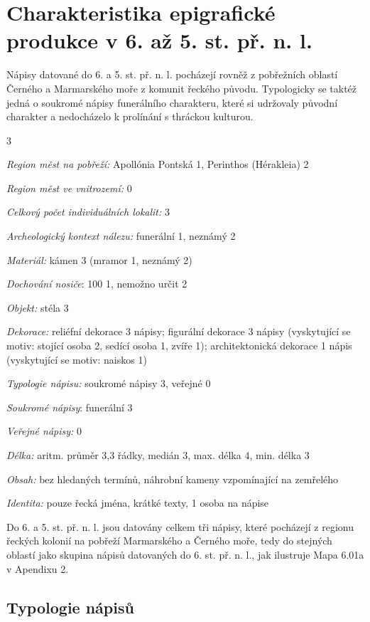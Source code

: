 \section[charakteristika-epigrafické-produkce-v-6.-až-5.-st.-př.-n.-l.]{Charakteristika epigrafické produkce v 6. až 5. st. př. n. l.}

Nápisy datované do 6. a 5. st. př. n. l. pocházejí rovněž z pobřežních oblastí Černého a Marmarského moře z komunit řeckého původu. Typologicky se taktéž jedná o soukromé nápisy funerálního charakteru, které si udržovaly původní charakter a nedocházelo k prolínání s thráckou kulturou.

\placetable[none]{}
\starttable[|l|]
\HL
{} 3

{\em Region měst na pobřeží:} Apollónia Pontská 1, Perinthos (Hérakleia) 2

{\em Region měst ve vnitrozemí:} 0

{\em Celkový počet individuálních lokalit:} 3

{\em Archeologický kontext nálezu:} funerální 1, neznámý 2

{\em Materiál:} kámen 3 (mramor 1, neznámý 2)

{\em Dochování nosiče}: 100  1, nemožno určit 2

{\em Objekt:} stéla 3

{\em Dekorace:} reliéfní dekorace 3 nápisy; figurální dekorace 3 nápisy (vyskytující se motiv: stojící osoba 2, sedící osoba 1, zvíře 1); architektonická dekorace 1 nápis (vyskytující se motiv: naiskos 1)

{\em Typologie nápisu:} soukromé nápisy 3, veřejné 0

{\em Soukromé nápisy}: funerální 3

{\em Veřejné nápisy:} 0

{\em Délka:} aritm. průměr 3,3 řádky, medián 3, max. délka 4, min. délka 3

{\em Obsah:} bez hledaných termínů, náhrobní kameny vzpomínající na zemřelého

{\em Identita:} pouze řecká jména, krátké texty, 1 osoba na nápise

\NC\AR
\HL
\HL
\stoptable

Do 6. a 5. st. př. n. l. jsou datovány celkem tři nápisy, které pocházejí z regionu řeckých kolonií na pobřeží Marmarského a Černého moře, tedy do stejných oblastí jako skupina nápisů datovaných do 6. st. př. n. l., jak ilustruje Mapa 6.01a v Apendixu 2.

\subsection[typologie-nápisů-1]{Typologie nápisů}

